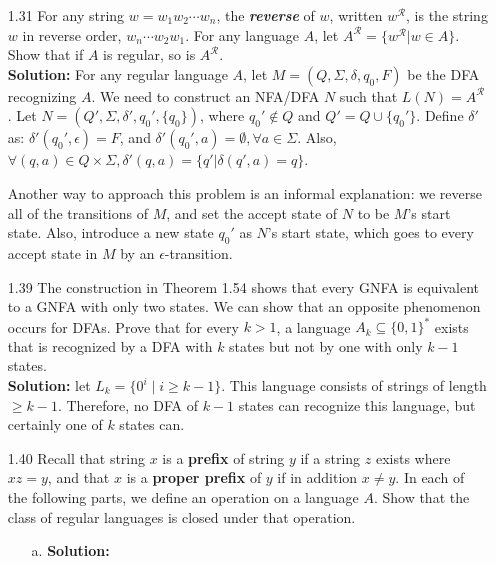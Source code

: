 \begin{enumerate}
\item[1.31]For any string $w = w_{1}w_{2}\cdots w_{n}$, the \textbf{\emph{reverse}} of $w$, written $w^{\mathcal{R}}$, is the string $w$ in reverse order, $w_n\cdots w_{2}w_{1}$. For any language $A$, let $A^{\mathcal{R}} = \{w^{\mathcal{R}} | w \in A\}$. Show that if $A$ is regular, so is $A^{\mathcal{R}}$. 
\\
\textbf{Solution:} For any regular language $A$, let $M = (Q, \Sigma, \delta, q_0, F)$ be the DFA recognizing $A$. We need to construct an NFA/DFA $N$ such that $L(N) = A^{\mathcal{R}}$. Let $N = (Q', \Sigma, \delta', q_0', \{q_0\})$, where $q_0' \notin Q$ and $Q' = Q \cup \{q_0'\}$. Define $\delta'$ as: $\delta'(q_0', \epsilon) = F$, and $\delta'(q_0', a) = \emptyset, \forall a \in \Sigma$. Also, $\forall (q, a) \in Q \times \Sigma, \delta'(q, a) = \{q' | \delta(q', a) = q\}$. 

\par Another way to approach this problem is an informal explanation: we reverse all of the transitions of $M$, and set the accept state of $N$ to be $M$'s start state. Also, introduce a new state $q_0'$ as $N$'s start state, which goes to every accept state in $M$ by an $\epsilon$-transition.

\item[1.39]The construction in Theorem 1.54 shows that every GNFA is equivalent to a GNFA with only two states. We can show that an opposite phenomenon occurs for DFAs. Prove that for every $k > 1$, a language $A_k \subseteq \{0,1\}^*$ exists that is recognized by a DFA with $k$ states but not by one with only $k-1$ states.
\\
\textbf{Solution:} let $L_k = \{0^i\;\vert\;i \ge k-1\}$. This language consists of strings of length $\ge k-1$. Therefore, no DFA of $k-1$ states can recognize this language, but certainly one of $k$ states can.

\item[1.40]Recall that string $x$ is a \textbf{prefix} of string $y$ if a string $z$ exists where $xz = y$, and that $x$ is a \textbf{proper prefix} of $y$ if in addition $x \ne y$. In each of the following parts, we define an operation on a language $A$. Show that the class of regular languages is closed under that operation.
\begin{enumerate}
\item[a.]\textbf{Solution:} \alreadyanswered
\end{enumerate}


\end{enumerate}

